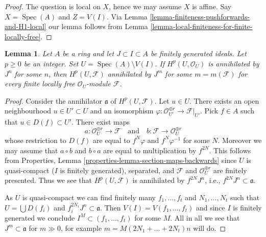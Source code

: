 \documentclass{stacks-project}
\newenvironment{reference}{\comment}{\endcomment}
\theoremstyle{plain}
\newtheorem{lemma}[subsection]{Lemma}
\theoremstyle{definition}
\theoremstyle{remark}
\numberwithin{equation}{subsection}
\def\Spec{\mathop{\mathrm{Spec}}}
\begin{document}
\begin{proof}
The question is local on $X$, hence we may assume $X$ is affine.
Say $X = \Spec(A)$ and $Z = V(I)$. Via
Lemma \ref{lemma-finiteness-pushforwards-and-H1-local}
our lemma follows from
Lemma \ref{lemma-local-finiteness-for-finite-locally-free}.
\end{proof}

\begin{lemma}
\label{lemma-annihilate-Hp}
\begin{reference}
\cite[Lemma 1.9]{Bhatt-local}
\end{reference}
Let $A$ be a ring and let $J \subset I \subset A$ be finitely generated ideals.
Let $p \geq 0$ be an integer. Set $U = \Spec(A) \setminus V(I)$. If
$H^p(U, \mathcal{O}_U)$ is annihilated by $J^n$ for some $n$, then
$H^p(U, \mathcal{F})$ annihilated by $J^m$ for some $m = m(\mathcal{F})$
for every finite locally free $\mathcal{O}_U$-module $\mathcal{F}$.
\end{lemma}

\begin{proof}
Consider the annihilator $\mathfrak a$ of $H^p(U, \mathcal{F})$.
Let $u \in U$. There exists an open neighbourhood $u \in U' \subset U$
and an isomorphism
$\varphi : \mathcal{O}_{U'}^{\oplus r} \to \mathcal{F}|_{U'}$.
Pick $f \in A$ such that $u \in D(f) \subset U'$.
There exist maps
$$
a : \mathcal{O}_U^{\oplus r} \longrightarrow \mathcal{F}
\quad\text{and}\quad
b : \mathcal{F} \longrightarrow \mathcal{O}_U^{\oplus r}
$$
whose restriction to $D(f)$ are equal to $f^N \varphi$
and $f^N \varphi^{-1}$ for some $N$. Moreover we may assume that
$a \circ b$ and $b \circ a$ are equal to multiplication by $f^{2N}$.
This follows from Properties, Lemma
\ref{properties-lemma-section-maps-backwards}
since $U$ is quasi-compact ($I$ is finitely generated), separated, and
$\mathcal{F}$ and $\mathcal{O}_U^{\oplus r}$ are finitely presented.
Thus we see that $H^p(U, \mathcal{F})$ is annihilated by
$f^{2N}J^n$, i.e., $f^{2N}J^n \subset \mathfrak a$.

\medskip\noindent
As $U$ is quasi-compact we can find finitely many $f_1, \ldots, f_t$
and $N_1, \ldots, N_t$ such that $U = \bigcup D(f_i)$ and
$f_i^{2N_i}J^n \subset \mathfrak a$. Then $V(I) = V(f_1, \ldots, f_t)$
and since $I$ is finitely generated we conclude
$I^M \subset (f_1, \ldots, f_t)$ for some $M$.
All in all we see that $J^m \subset \mathfrak a$ for
$m \gg 0$, for example $m = M (2N_1 + \ldots + 2N_t) n$  will do.
\end{proof}
\end{document}
